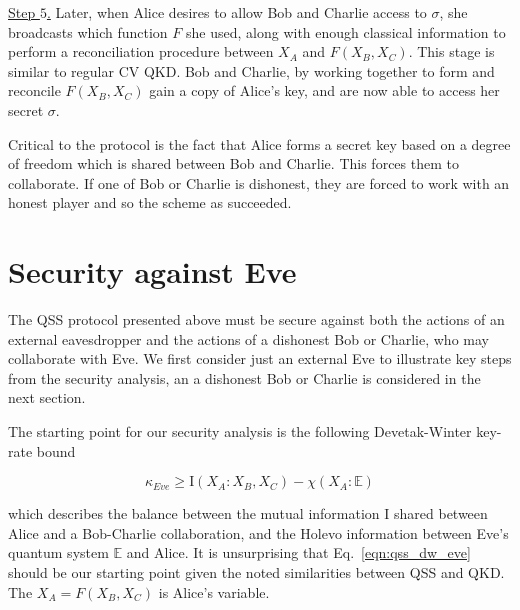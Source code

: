 \noindent \underline{Step $5$.} Later, when Alice desires to allow Bob and Charlie access to $\sigma$, she broadcasts which function $F$ she used, along with enough classical information to perform a reconciliation procedure between $X_A$ and $F\left(X_B, X_C\right)$. This stage is similar to regular CV QKD. Bob and Charlie, by working together to form and reconcile $F\left(X_B, X_C\right)$ gain a copy of Alice's key, and are now able to access her secret $\sigma$.

Critical to the protocol is the fact that Alice forms a secret key based on a degree of freedom which is shared between Bob and Charlie. This forces them to collaborate. If one of Bob or Charlie is dishonest, they are forced to work with an honest player and so the scheme as succeeded.




\section{Security against Eve}

The QSS protocol presented above must be secure against both the actions of an external eavesdropper and the actions of a dishonest Bob or Charlie, who may collaborate with Eve. We first consider just an external Eve to illustrate key steps from the security analysis, an a dishonest Bob or Charlie is considered in the next section.

The starting point for our security analysis is the following Devetak-Winter key-rate bound  

\begin{equation}\label{eqn:qss_dw_eve}
\kappa_{Eve} \ge \text{I}\left(X_A : X_B, X_C\right) - \chi\left(X_A : \mathbb{E}\right)
\end{equation}

\noindent which describes the balance between the mutual information $\text{I}$ shared between Alice and a Bob-Charlie collaboration, and the Holevo information between Eve's quantum system $\mathbb{E}$ and Alice. It is unsurprising that Eq.~\ref{eqn:qss_dw_eve} should be our starting point given the noted similarities between QSS and QKD. The $X_A = F\left(X_B, X_C\right)$ is Alice's variable.

